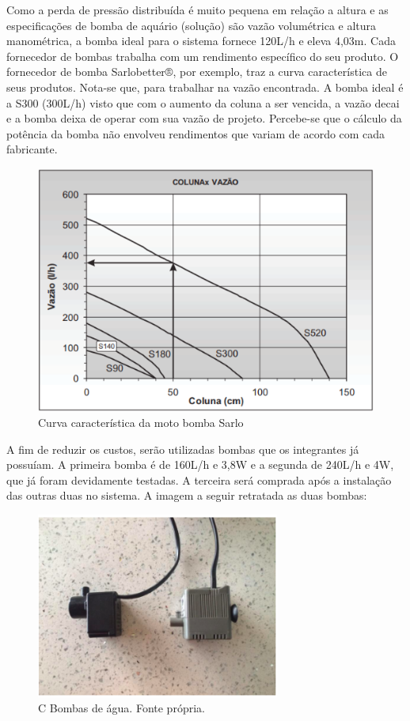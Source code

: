Como a perda de pressão distribuída é muito pequena em relação a altura e as especificações de bomba de aquário (solução) são vazão volumétrica e altura manométrica, a bomba ideal para o sistema fornece 120L/h e eleva 4,03m. Cada fornecedor de bombas trabalha com um rendimento específico do seu produto. O fornecedor de bomba Sarlobetter®, por exemplo, traz a curva característica de seus produtos. Nota-se que, para trabalhar na vazão encontrada. A bomba ideal é a S300 (300L/h) visto que com o aumento da coluna a ser vencida, a vazão decai e a bomba deixa de operar com sua vazão de projeto.  
Percebe-se que o cálculo da potência da bomba não envolveu rendimentos que variam de acordo com cada fabricante.
 

\begin{figure}[H]
	\centering
	\includegraphics[width=13cm]{figuras/coluna.png}
	\caption{Curva característica da moto bomba Sarlo}
	\label{coluna}
\end{figure}

A fim de reduzir os custos, serão utilizadas bombas que os integrantes já possuíam. A primeira bomba é de 160L/h e 3,8W e a segunda de 240L/h e 4W, que já foram devidamente testadas. A terceira será comprada após a instalação das outras duas no sistema. A imagem a seguir retratada as duas bombas:

\begin{figure}[H]
	\centering
	\includegraphics[width=8cm]{figuras/bombas.png}
	\caption{C Bombas de água. Fonte própria.}
	\label{coluna}
\end{figure}

